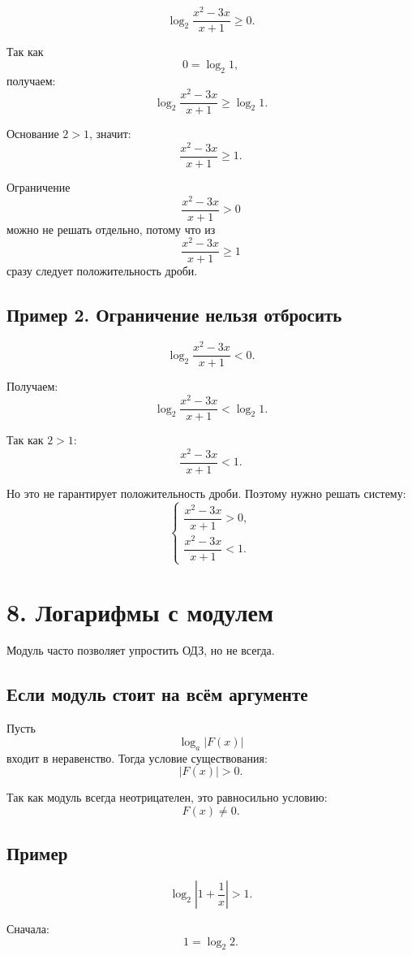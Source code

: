 \documentclass[a4paper,12pt]{article}
\newcommand{\sectionline}{\vspace{0.35em}{\color{accent}\hrule height 0.6pt}\vspace{0.65em}}
\begin{document}
\[
\log_2\frac{x^2-3x}{x+1}\ge0.
\]

Так как
\[
0=\log_2 1,
\]
получаем:
\[
\log_2\frac{x^2-3x}{x+1}\ge\log_2 1.
\]

Основание $2>1$, значит:
\[
\frac{x^2-3x}{x+1}\ge1.
\]

Ограничение
\[
\frac{x^2-3x}{x+1}>0
\]
можно не решать отдельно, потому что из
\[
\frac{x^2-3x}{x+1}\ge1
\]
сразу следует положительность дроби.

\subsection*{\textcolor{accent}{Пример 2. Ограничение нельзя отбросить}}

\[
\log_2\frac{x^2-3x}{x+1}<0.
\]

Получаем:
\[
\log_2\frac{x^2-3x}{x+1}<\log_2 1.
\]

Так как $2>1$:
\[
\frac{x^2-3x}{x+1}<1.
\]

Но это не гарантирует положительность дроби. Поэтому нужно решать систему:
\[
\begin{cases}
\dfrac{x^2-3x}{x+1}>0,\\[0.6em]
\dfrac{x^2-3x}{x+1}<1.
\end{cases}
\]

\section*{\textcolor{darkaccent}{8. Логарифмы с модулем}}
\sectionline

Модуль часто позволяет упростить ОДЗ, но не всегда.

\subsection*{\textcolor{accent}{Если модуль стоит на всём аргументе}}

Пусть
\[
\log_a |F(x)|
\]
входит в неравенство. Тогда условие существования:
\[
|F(x)|>0.
\]

Так как модуль всегда неотрицателен, это равносильно условию:
\[
F(x)\ne0.
\]

\subsection*{\textcolor{accent}{Пример}}

\[
\log_2\left|1+\frac1x\right|>1.
\]

Сначала:
\[
1=\log_2 2.
\]
\end{document}
